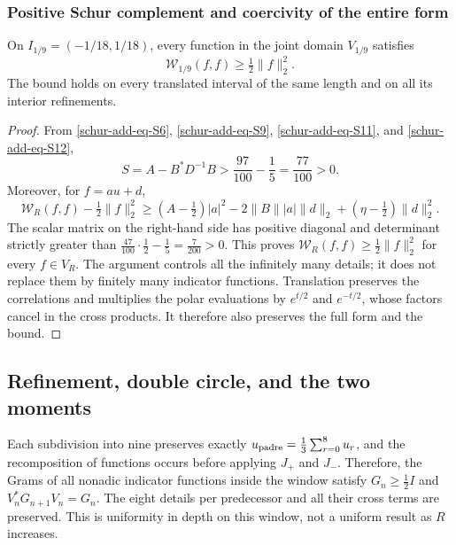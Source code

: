 \subsubsection{Positive Schur complement and coercivity of the entire form}
\label{schur-add-sub-348}

\begin{theorem}
\label{schur-add:coercividad-ventana}
On \(I_{1/9}=(-1/18,1/18)\), every function in the joint domain
\(V_{1/9}\) satisfies
\[
\mathscr W_{1/9}(f,f)\geq\tfrac12\|f\|_2^2.
\]
The bound holds on every translated interval of the same length and on all
its interior refinements.
\end{theorem}
\begin{proof}
From \eqref{schur-add-eq-S6}, \eqref{schur-add-eq-S9},
\eqref{schur-add-eq-S11}, and \eqref{schur-add-eq-S12},
\begin{equation}
S=A-B^*D^{-1}B>\frac{97}{100}-\frac15=\frac{77}{100}>0.
\label{schur-add-display-29}
\end{equation}
Moreover, for \(f=au+d\),
\begin{equation}
\mathscr W_R(f,f)-\tfrac12\|f\|_2^2
\geq(A-\tfrac12)|a|^2
-2\|B\||a|\|d\|_2+(\eta-\tfrac12)\|d\|_2^2.
\label{schur-add-display-30}
\end{equation}
The scalar matrix on the right-hand side has positive diagonal and
determinant strictly greater than
\(\tfrac{47}{100}\cdot\tfrac12-\tfrac15=\tfrac7{200}>0\).
This proves \(\mathscr W_R(f,f)\geq\tfrac12\|f\|_2^2\)
for every \(f\in V_R\). The argument controls all the infinitely many
details; it does not replace them by finitely many indicator functions. Translation
preserves the correlations and multiplies the polar evaluations
by \(e^{t/2}\) and \(e^{-t/2}\), whose factors cancel in the cross products.
It therefore also preserves the full form and the bound.
\end{proof}

\subsection{Refinement, double circle, and the two moments}
\label{schur-add-sub-367}

Each subdivision into nine preserves exactly
\(u_{\rm padre}=\tfrac13\sum_{r=0}^8u_r\), and the recomposition of
functions occurs before applying \(J_+\) and \(J_-\). Therefore,
the Grams of all nonadic indicator functions inside the window
satisfy \(G_n\geq\tfrac12 I\) and
\(V_n^*G_{n+1}V_n=G_n\). The eight details per predecessor and
all their cross terms are preserved. This is uniformity in depth on this window,
not a uniform result as \(R\) increases.

